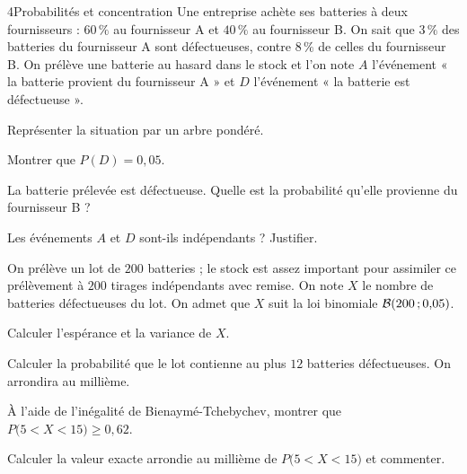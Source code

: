 

\begin{exoBac}{4}{Probabilités et concentration}
Une entreprise achète ses batteries à deux fournisseurs : $60\,\%$ au fournisseur A et $40\,\%$ au fournisseur B. On sait que $3\,\%$
des batteries du fournisseur A sont défectueuses, contre $8\,\%$ de celles du fournisseur B. On prélève une batterie au hasard dans le
stock et l'on note $A$ l'événement « la batterie provient du fournisseur A » et $D$ l'événement « la batterie est défectueuse ».
\begin{questions}
  \item Représenter la situation par un arbre pondéré.
  \item Montrer que $P(D)=0{,}05$.
  \item La batterie prélevée est défectueuse. Quelle est la probabilité qu'elle provienne du fournisseur B ?
  \item Les événements $A$ et $D$ sont-ils indépendants ? Justifier.
\end{questions}
On prélève un lot de $200$ batteries ; le stock est assez important pour assimiler ce prélèvement à $200$ tirages indépendants avec
remise. On note $X$ le nombre de batteries défectueuses du lot. On admet que $X$ suit la loi binomiale $\mathcal{B}(200\,{;}\,0{,}05)$.
\begin{questions}[resume]
  \item Calculer l'espérance et la variance de $X$.
  \item Calculer la probabilité que le lot contienne au plus $12$ batteries défectueuses. On arrondira au millième.
  \item À l'aide de l'inégalité de Bienaymé-Tchebychev, montrer que $P\big(5<X<15\big)\geq0{,}62$.
  \item Calculer la valeur exacte arrondie au millième de $P\big(5<X<15\big)$ et commenter.
\end{questions}
\end{exoBac}

